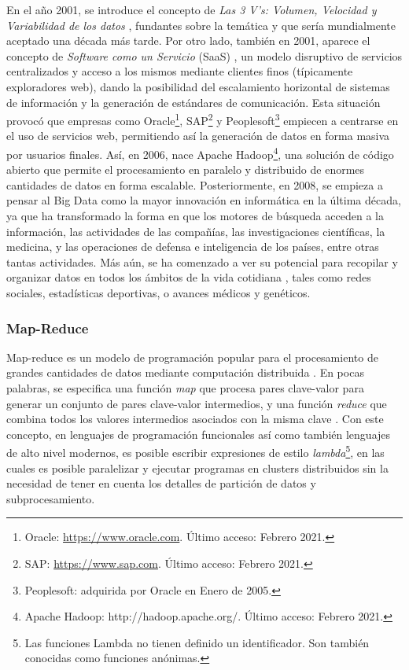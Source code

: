 \bigskip En el año 2001, se introduce el concepto de \textit{Las 3 V’s: Volumen, Velocidad y Variabilidad de los datos} \citep{laney20013d}, fundantes sobre la temática y que sería mundialmente aceptado una década más tarde. Por otro lado, también en 2001, aparece el concepto de \textit{Software como un Servicio} (SaaS) \citep{hoch2001software}, un modelo disruptivo de servicios centralizados y acceso a los mismos mediante clientes finos (típicamente exploradores web), dando la posibilidad del escalamiento horizontal de sistemas de información y la generación de estándares de comunicación. Esta situación provocó que empresas como Oracle\footnote{Oracle: \url{https://www.oracle.com}. Último acceso: Febrero 2021.}, SAP\footnote{SAP: \url{https://www.sap.com}. Último acceso: Febrero 2021.} y Peoplesoft\footnote{Peoplesoft: adquirida por Oracle en Enero de 2005.} empiecen a centrarse en el uso de servicios web, permitiendo así la generación de datos en forma masiva por usuarios finales. Así, en 2006, nace Apache Hadoop\footnote{Apache Hadoop: http://hadoop.apache.org/. Último acceso: Febrero 2021.}, una solución de código abierto que permite el procesamiento en paralelo y distribuido de enormes cantidades de datos en forma escalable. Posteriormente, en 2008, se empieza a pensar al Big Data como la mayor innovación en informática en la última década, ya que ha transformado la forma en que los motores de búsqueda acceden a la información, las actividades de las compañías, las investigaciones científicas, la medicina, y las operaciones de defensa e inteligencia de los países, entre otras tantas actividades. Más aún, se ha comenzado a ver su potencial para recopilar y organizar datos en todos los ámbitos de la vida cotidiana \citep{bryant2008big}, tales como redes sociales, estadísticas deportivas, o avances médicos y genéticos.

\subsubsection{Map-Reduce}
Map-reduce es un modelo de programación popular para el procesamiento de grandes cantidades de datos mediante computación distribuida \citep{condie2010mapreduce}. En pocas palabras, se especifica una función \textit{map} que procesa pares clave-valor para generar un conjunto de pares clave-valor intermedios, y una función \textit{reduce} que combina todos los valores intermedios asociados con la misma clave \citep{dean2008mapreduce}. Con este concepto, en lenguajes de programación funcionales así como también lenguajes de alto nivel modernos, es posible escribir expresiones de estilo \textit{lambda}\footnote{Las funciones Lambda no tienen definido un identificador. Son también conocidas como funciones anónimas.}, en las cuales es posible paralelizar y ejecutar programas en clusters distribuidos sin la necesidad de tener en cuenta los detalles de partición de datos y subprocesamiento.

